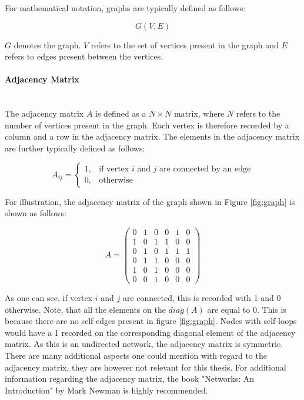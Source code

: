 	\noindent For mathematical notation, graphs are typically defined as follows:

	\begin{equation}
		G(V,E)
	\end{equation}

	\noindent $G$ denotes the graph. $V$ refers to the set of vertices present 
	in the graph and $E$ refers to edges present between the vertices.

	\paragraph{Adjacency Matrix} \mbox{}\\  

	\noindent The adjacency matrix $A$ is defined as a $N \times N$ matrix, 
	where $N$ refers to the number of vertices present in the graph. Each 
	vertex is therefore recorded by a column and a row in the adjacency matrix. 
	The elements in the adjacency matrix are further typically defined as follows:

	\begin{equation}
		A_{ij} = 
			\begin{cases}
				1, & \text{if vertex $i$ and $j$ are connected by an edge} \\
				0, & \text{otherwise}
			\end{cases}
	\end{equation}
	
	\noindent For illustration, the adjacency matrix of the graph shown in 
	Figure \ref{fig:graph} is shown as follows:

	\[ A = 
	\begin{pmatrix}
		0 & 1 & 0 & 0 & 1 & 0 \\
		1 & 0 & 1 & 1 & 0 & 0 \\
		0 & 1 & 0 & 1 & 1 & 1 \\
		0 & 1 & 1 & 0 & 0 & 0 \\
		1 & 0 & 1 & 0 & 0 & 0 \\
		0 & 0 & 1 & 0 & 0 & 0  
	\end{pmatrix}
	\] 
	
	\noindent As one can see, if vertex $i$ and $j$ are connected, this is 
	recorded with 1 and 0 otherwise. Note, that all the elements on the 
	$diag(A)$ are equal to 0. This is because there are no self-edges present 
	in figure \ref{fig:graph}. Nodes with self-loops would have a 1 recorded on 
	the corresponding diagonal element of the adjacency matrix. As this is an 
	undirected network, the adjacency matrix is symmetric. There are many 
	additional aspects one could mention with regard to the adjacency matrix, 
	they are however not relevant for this thesis. For additional information 
	regarding the adjacency matrix, the book "Networks: An Introduction" by 
	Mark Newman \citeyearpar{Newman2010} is highly recommended. 

